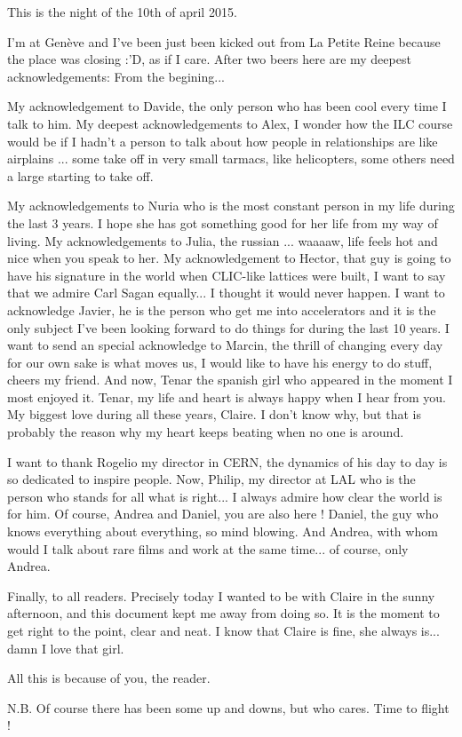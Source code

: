 \vfill
This is the night of the 10th of april 2015.\par
I'm at Gen\`eve and I've been just been kicked out from La Petite Reine because the place was closing :'D, as if I care. After two beers here are my deepest acknowledgements:
From the begining...\par
My acknowledgement to Davide, the only person who has been cool every time I talk to him. My deepest acknowledgements to Alex, I wonder how the ILC course would be if I hadn't a person to talk about how people in relationships are like airplains ... some take off in very small tarmacs, like helicopters, some others need a large starting to take off.\par
My acknowledgements to Nuria who is the most constant person in my life during the last 3 years. I hope she has got something good for her life from my way of living. My acknowledgements to Julia, the russian ... waaaaw, life feels hot and nice when you speak to her. My acknowledgement to Hector, that guy is going to have his signature in the world when CLIC-like lattices were built, I want to say that we admire Carl Sagan equally... I thought it would never happen. I want to acknowledge Javier, he is the person who get me into accelerators and it is the only subject I've been looking forward to do things for during the last 10 years. I want to send an special acknowledge to Marcin, the thrill of changing every day for our own sake is what moves us, I would like to have his energy to do stuff, cheers my friend. And now, Tenar the spanish girl who appeared in the moment I most enjoyed it. Tenar, my life and heart is always happy when I hear from you. My biggest love during all these years, Claire. I don't know why, but that is probably the reason why my heart keeps beating when no one is around.\par
I want to thank Rogelio my director in CERN, the dynamics of his day to day is so dedicated to inspire people. Now, Philip, my director at LAL who is the person who stands for all what is right... I always admire how clear the world is for him. Of course, Andrea and Daniel, you are also here ! Daniel, the guy who knows everything about everything, so mind blowing. And Andrea, with whom would I talk about rare films and work at the same time... of course, only Andrea.\par
Finally, to all readers. Precisely today I wanted to be with Claire in the sunny afternoon, and this document kept me away from doing so. It is the moment to get right to the point, clear and neat. I know that Claire is fine, she always is... damn I love that girl.\par
All this is because of you, the reader.\par
N.B. Of course there has been some up and downs, but who cares. Time to flight !
\vfill